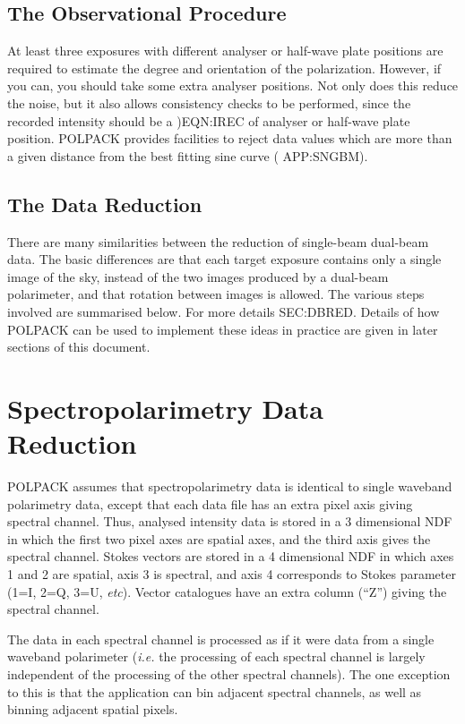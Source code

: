 \documentclass[twoside,11pt]{starlink}
\begin{document}
\subsection{The Observational Procedure}
At least three exposures with different analyser or half-wave plate
positions are required to estimate the degree and orientation of the
polarization. However, if you can, you should take some extra analyser
positions. Not only does this reduce the noise, but it also allows
consistency checks to be performed, since the recorded intensity should
be a 
{)}{EQN:IREC} of analyser or half-wave plate position. POLPACK provides
facilities to reject data values which are more than a given distance from
the best fitting sine curve (
{APP:SNGBM}).

\subsection{The Data Reduction}
There are many similarities between the reduction of single-beam
dual-beam data. The basic differences are that each target exposure
contains only a single image of the sky, instead of the two images
produced by a dual-beam polarimeter, and that rotation between images is
allowed. The various steps involved are
summarised below. For more details 
{}{SEC:DBRED}. Details of how POLPACK can be used to implement these
ideas in practice are given in later sections of this document.

\section{\label{SEC:SPEC}Spectropolarimetry
Data Reduction}
POLPACK assumes that spectropolarimetry data is identical to single
waveband polarimetry data, except that each data file has an extra pixel
axis giving spectral channel. Thus, analysed intensity data is stored in a
3 dimensional NDF in which the first two pixel axes are spatial axes, and the
third axis gives the spectral channel. Stokes vectors are stored in a 4
dimensional NDF in which axes 1 and 2 are spatial, axis 3 is spectral, and
axis 4 corresponds to Stokes parameter (1=I, 2=Q, 3=U, \emph{etc}).
Vector catalogues have an extra column (``Z'') giving the spectral channel.

The data in each spectral channel is processed as if it were data from a
single waveband polarimeter (\emph{i.e.} the processing of each spectral
channel is largely independent of the processing of the other spectral
channels). The one exception to this is that the 
application can bin adjacent spectral channels, as well as binning
adjacent spatial pixels.
\end{document}
